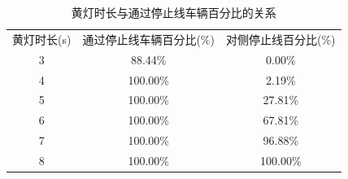 \documentclass[withoutpreface,bwprint]{cumcmthesis}
\begin{document}
\begin{table}[ht]
	\centering %
	\begin{tabular}{| c | c | c |} %
		\hline %
		黄灯时长(s) & 通过停止线车辆百分比(\%) & 对侧停止线百分比(\%) \\
		3 & 88.44\% & 0.00\% \\
		4 & 100.00\% & 2.19\%  \\
		5 & 100.00\% & 27.81\%  \\
		6 & 100.00\% & 67.81\%  \\
		7 & 100.00\% & 96.88\%  \\
		8 & 100.00\% & 100.00\%  \\
		\bottomrule %
	\end{tabular}
	\caption{黄灯时长与通过停止线车辆百分比的关系} %
	\label{tab:yellow_light_duration} %
\end{table}





\end{document}
